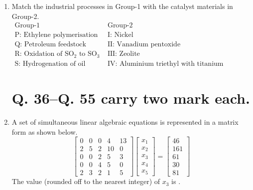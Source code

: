\documentclass[journal,12pt,onecolumn]{IEEEtran}
\theoremstyle{remark}
\begin{document}
\begin{enumerate}
\item Match the industrial processes in Group-1 with the catalyst materials in Group-2.
\[\begin{array}{c|l}\text{Group-1} & \text{Group-2} \\\hline\text{P: Ethylene polymerisation} & \text{I: Nickel} \\\text{Q: Petroleum feedstock cracking} & \text{II: Vanadium pentoxide} \\\text{R: Oxidation of SO}_2 \text{ to SO}_3 & \text{III: Zeolite} \\\text{S: Hydrogenation of oil} & \text{IV: Aluminium triethyl with titanium chloride promoter}\end{array}\]
\hfill{}
\begin{enumerate}
\end{enumerate}
\section*{Q. 36--Q. 55 carry two mark each.}

\item A set of simultaneous linear algebraic equations is represented in a matrix form as shown below.
\[\begin{bmatrix}0 & 0 & 0 & 4 & 13 \\2 & 5 & 2 & 10 & 0 \\0 & 0 & 2 & 5 & 3 \\0 & 0 & 4 & 5 & 0 \\2 & 3 & 2 & 1 & 5\end{bmatrix}\begin{bmatrix}x_1 \\x_2 \\x_3 \\x_4 \\x_5\end{bmatrix}=\begin{bmatrix}46 \\161 \\61 \\30 \\81\end{bmatrix}\]
The value (rounded off to the nearest integer) of $x_3$ is \underline{\hspace{1cm}}.


\end{enumerate}
\end{document}
